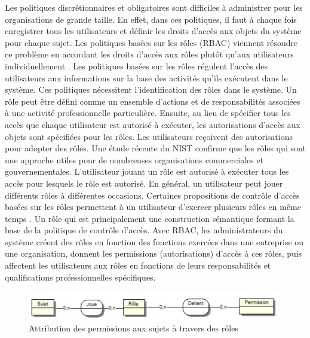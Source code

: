 \label{sectionRBAC}

Les politiques discrétionnaires et obligatoires sont difficiles à administrer pour les organisations de grande taille. En effet, dans ces politiques, il faut à chaque fois enregistrer tous les utilisateurs et définir les droits d'accès aux objets du système pour chaque sujet. Les politiques basées sur les rôles  (RBAC) viennent résoudre ce problème en accordant les droits d'accès aux rôles plutôt qu'aux utilisateurs individuellement \cite{sandhu96}. Les politiques basées sur les rôles régulent l'accès des utilisateurs aux informations sur la base des activités qu'ils exécutent dans le système. Ces politiques nécessitent l'identification des rôles dans le système. Un rôle peut être défini comme un ensemble d'actions et de responsabilités associées à une activité professionnelle particulière. Ensuite, au lieu de spécifier tous les accès que chaque utilisateur est autorisé à exécuter, les autorisations d'accès aux objets sont spécifiées pour les rôles. Les utilisateurs reçoivent des autorisations pour adopter des rôles. Une étude récente du NIST confirme que les rôles qui sont une approche utiles pour de nombreuses organisations commerciales et gouvernementales. L'utilisateur jouant un rôle est autorisé à exécuter tous les accès pour lesquels le rôle est autorisé. En général, un utilisateur peut jouer différents rôles à différentes occasions. Certaines propositions de contrôle d'accès basées sur les rôles permettent à un utilisateur d'exercer plusieurs rôles en même temps \cite{sandhu94}. Un rôle qui est principalement une construction sémantique formant la base de la politique de contrôle d'accès. Avec RBAC, les administrateurs du système créent des rôles en fonction des fonctions exercées dans une entreprise ou une organisation, donnent les permissions (autorisations) d'accès à ces rôles, puis affectent les utilisateurs aux rôles en fonctions de leurs responsabilités et qualifications professionnelles spécifiques.

\begin{figure}[h!]
    \centering
		\includegraphics[scale=0.7]{chap2/images/RBACstandard.png}
    \caption{Attribution des permissions aux sujets à travers des rôles}
	 \label{figARbac}
\end{figure}

